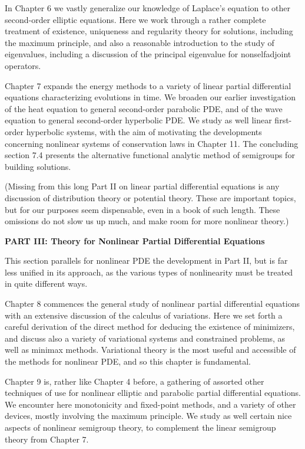 In Chapter 6 we vastly generalize our knowledge of Laplace's equation to other second-order elliptic equations. Here we work through a rather complete treatment of existence, uniqueness and regularity theory for solutions, including the maximum principle, and also a reasonable introduction to the study of eigenvalues, including a discussion of the principal eigenvalue for nonselfadjoint operators.

Chapter 7 expands the energy methods to a variety of linear partial differential equations characterizing evolutions in time. We broaden our earlier investigation of the heat equation to general second-order parabolic PDE, and of the wave equation to general second-order hyperbolic PDE. We study as well linear first-order hyperbolic systems, with the aim of motivating the developments concerning nonlinear systems of conservation laws in Chapter 11. The concluding section 7.4 presents the alternative functional analytic method of semigroups for building solutions.

(Missing from this long Part II on linear partial differential equations is any discussion of distribution theory or potential theory. These are important topics, but for our purposes seem dispensable, even in a book of such length. These omissions do not slow us up much, and make room for more nonlinear theory.)

\textbf{PART III: Theory for Nonlinear Partial Differential Equations}

This section parallels for nonlinear PDE the development in Part II, but is far less unified in its approach, as the various types of nonlinearity must be treated in quite different ways.

Chapter 8 commences the general study of nonlinear partial differential equations with an extensive discussion of the calculus of variations. Here we set forth a careful derivation of the direct method for deducing the existence of minimizers, and discuss also a variety of variational systems and constrained problems, as well as minimax methods. Variational theory is the most useful and accessible of the methods for nonlinear PDE, and so this chapter is fundamental.

Chapter 9 is, rather like Chapter 4 before, a gathering of assorted other techniques of use for nonlinear elliptic and parabolic partial differential equations. We encounter here monotonicity and fixed-point methods, and a variety of other devices, mostly involving the maximum principle. We study as well certain nice aspects of nonlinear semigroup theory, to complement the linear semigroup theory from Chapter 7.

